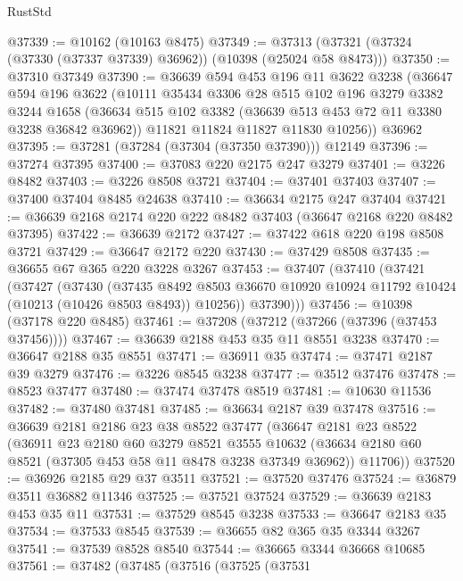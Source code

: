 \begin{lexlean}{RustStd}
\begin{coremodule}
{\begin{coremodule}
{{{{{{{{{{{{{{{{{{{{{{{{{{@37339 := @10162 (@10163 @8475)
@37349 := @37313 (@37321 (@37324 (@37330 (@37337 @37339) @36962)) (@10398 (@25024 @58 @8473)))
@37350 := @37310 @37349
@37390 := @36639
    @594
    @453
    @196
    @11
    @3622
    @3238
    (@36647
      @594
      @196
      @3622
      (@10111
        @35434
        @3306
        @28
        @515
        @102
        @196
        @3279
        @3382
        @3244
        @1658
        (@36634 @515 @102 @3382 (@36639 @513 @453 @72 @11 @3380 @3238 @36842 @36962))
        @11821
        @11824
        @11827
        @11830
        @10256))
    @36962
@37395 := @37281 (@37284 (@37304 (@37350 @37390))) @12149
@37396 := @37274 @37395
@37400 := @37083 @220 @2175 @247 @3279
@37401 := @3226 @8482
@37403 := @3226 @8508 @3721
@37404 := @37401 @37403
@37407 := @37400 @37404 @8485 @24638
@37410 := @36634 @2175 @247 @37404
@37421 := @36639 @2168 @2174 @220 @222 @8482 @37403 (@36647 @2168 @220 @8482 @37395)
@37422 := @36639 @2172
@37427 := @37422 @618 @220 @198 @8508 @3721
@37429 := @36647 @2172 @220
@37430 := @37429 @8508
@37435 := @36655 @67 @365 @220 @3228 @3267
@37453 := @37407
    (@37410
      (@37421
        (@37427
          (@37430
            (@37435
              @8492
              @8503
              @36670
              @10920
              @10924
              @11792
              @10424
              (@10213 (@10426 @8503 @8493))
              @10256))
          @37390)))
@37456 := @10398 (@37178 @220 @8485)
@37461 := @37208 (@37212 (@37266 (@37396 (@37453 @37456))))
@37467 := @36639 @2188 @453 @35 @11 @8551 @3238
@37470 := @36647 @2188 @35 @8551
@37471 := @36911 @35
@37474 := @37471 @2187 @39 @3279
@37476 := @3226 @8545 @3238
@37477 := @3512 @37476
@37478 := @8523 @37477
@37480 := @37474 @37478 @8519
@37481 := @10630 @11536
@37482 := @37480 @37481
@37485 := @36634 @2187 @39 @37478
@37516 := @36639
    @2181
    @2186
    @23
    @38
    @8522
    @37477
    (@36647
      @2181
      @23
      @8522
      (@36911
        @23
        @2180
        @60
        @3279
        @8521
        @3555
        @10632
        (@36634 @2180 @60 @8521 (@37305 @453 @58 @11 @8478 @3238 @37349 @36962))
        @11706))
@37520 := @36926 @2185 @29 @37 @3511
@37521 := @37520 @37476
@37524 := @36879 @3511 @36882 @11346
@37525 := @37521 @37524
@37529 := @36639 @2183 @453 @35 @11
@37531 := @37529 @8545 @3238
@37533 := @36647 @2183 @35
@37534 := @37533 @8545
@37539 := @36655 @82 @365 @35 @3344 @3267
@37541 := @37539 @8528 @8540
@37544 := @36665 @3344 @36668 @10685
@37561 := @37482
    (@37485
      (@37516
        (@37525
          (@37531
}}}}}}}}}}}}}}}}}}}}}}}}}}
\end{coremodule}}
\end{coremodule}
\end{lexlean}
